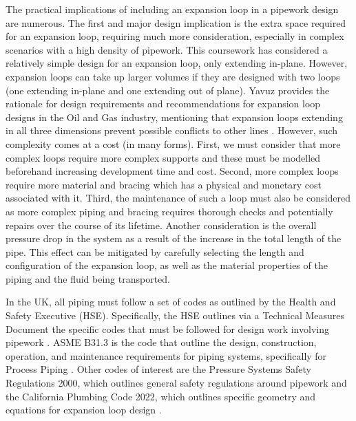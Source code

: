 The practical implications of including an expansion loop in a pipework design are numerous. The first and major design implication is the extra space required for an expansion loop, requiring much more consideration, especially in complex scenarios with a high density of pipework. This coursework has considered a relatively simple design for an expansion loop, only extending in-plane. However, expansion loops can take up larger volumes if they are designed with two loops (one extending in-plane and one extending out of plane). Yavuz provides the rationale for design requirements and recommendations for expansion loop designs in the Oil and Gas industry, mentioning that expansion loops extending in all three dimensions prevent possible conflicts to other lines \cite{expansionLoop1}. However, such complexity comes at a cost (in many forms). First, we must consider that more complex loops require more complex supports and these must be modelled beforehand increasing development time and cost. Second, more complex loops require more material and bracing which has a physical and monetary cost associated with it. Third, the maintenance of such a loop must also be considered as more complex piping and bracing requires thorough checks and potentially repairs over the course of its lifetime. Another consideration is the overall pressure drop in the system as a result of the increase in the total length of the pipe. This effect can be mitigated by carefully selecting the length and configuration of the expansion loop, as well as the material properties of the piping and the fluid being transported.

In the UK, all piping must follow a set of codes as outlined by the Health and Safety Executive (HSE). Specifically, the HSE outlines via a Technical Measures Document the specific codes that must be followed for design work involving pipework \cite{hseCode1}. ASME B31.3 is the code  that outline the design, construction, operation, and maintenance requirements for piping systems, specifically for Process Piping \cite{asmeb31}. Other codes of interest are the Pressure Systems Safety Regulations 2000, which outlines general safety regulations around pipework and the California Plumbing Code 2022, which outlines specific geometry and equations for expansion loop design \cite{hseCode2,caliCode}.

